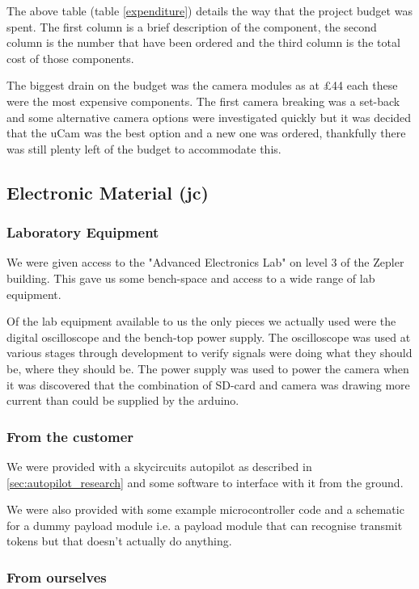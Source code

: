 The above table (table \ref{expenditure}) details the way that the project budget was spent. The first column is a brief description of the component, the second column is the number that have been ordered and the third column is the total cost of those components.

The biggest drain on the budget was the camera modules as at \pounds 44 each these were the most expensive components. The first camera breaking was a set-back and some alternative camera options were investigated quickly but it was decided that the uCam was the best option and a new one was ordered, thankfully there was still plenty left of the budget to accommodate this.

\subsection{Electronic Material (jc)}

\subsubsection{Laboratory Equipment}

We were given access to the "Advanced Electronics Lab" on level 3 of the Zepler building. This gave us some bench-space and access to a wide range of lab equipment.

Of the lab equipment available to us the only pieces we actually used were the digital oscilloscope and the bench-top power supply. The oscilloscope was used at various stages through development to verify signals were doing what they should be, where they should be. The power supply was used to power the camera when it was discovered that the combination of SD-card and camera was drawing more current than could be supplied by the arduino.

\subsubsection{From the customer}

We were provided with a skycircuits autopilot \cite{SkyCircuits} as described in \ref{sec:autopilot_research} and some software to interface with it from the ground.

We were also provided with some example microcontroller code and a schematic for a dummy payload module i.e. a payload module that can recognise transmit tokens but that doesn't actually do anything.

\subsubsection{From ourselves}

